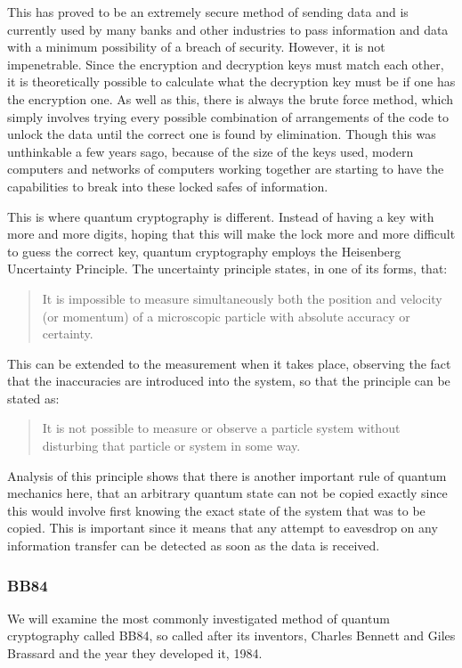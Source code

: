 This has proved to be an extremely secure method of sending data and is currently used by many banks and other industries to pass information and data with a minimum possibility of a breach of security. However, it is not impenetrable. Since the encryption and decryption keys must match each other, it is theoretically possible to calculate what the decryption key must be if one has the encryption one. As well as this, there is always the brute force method, which simply involves trying every possible combination of arrangements of the code to unlock the data until the correct one is found by elimination. Though this was unthinkable a few years sago, because of the size of the keys used, modern computers and networks of computers working together are starting to have the capabilities to break into these locked safes of information.

This is where quantum cryptography is different. Instead of having a key with more and more digits, hoping that this will make the lock more and more difficult to guess the correct key, quantum cryptography employs the Heisenberg Uncertainty Principle. The uncertainty principle states, in one of its forms, that:
\begin{quote}
	It is impossible to measure simultaneously both the position and velocity (or momentum) of a microscopic particle with absolute accuracy or certainty.
\end{quote}
This can be extended to the measurement when it takes place, observing the fact that the inaccuracies are introduced into the system, so that the principle can be stated as:
\begin{quote}
	It is not possible to measure or observe a particle system without disturbing that particle or system in some way.
\end{quote}

Analysis of this principle shows that there is another important rule of quantum mechanics here, that an arbitrary quantum state can not be copied exactly since this would involve first knowing the exact state of the system that was to be copied. This is important since it means that any attempt to eavesdrop on any information transfer can be detected as soon as the data is received.

\subsubsection{BB84}
We will examine the most commonly investigated method of quantum cryptography called BB84, so called after its inventors, Charles Bennett and Giles Brassard and the year they developed it, 1984\cite{DBLP:journals/joc/BennettBBSS92}.

